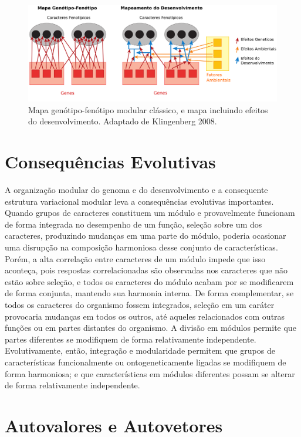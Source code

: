 \documentclass[portuges,]{tufte-handout}
\begin{document}
\begin{figure}
\includegraphics{./figuras/mapgenfen.png}
\caption{Mapa genótipo-fenótipo modular clássico, e mapa incluindo
efeitos do desenvolvimento. Adaptado de Klingenberg 2008.}
\label{mapagenfen}
\end{figure}

\section{Consequências Evolutivas}\label{consequuxeancias-evolutivas}

A organização modular do genoma e do desenvolvimento e a consequente
estrutura variacional modular leva a consequências evolutivas
importantes. Quando grupos de caracteres constituem um módulo e
provavelmente funcionam de forma integrada no desempenho de um função,
seleção sobre um dos caracteres, produzindo mudanças em uma parte do
módulo, poderia ocasionar uma disrupção na composição harmoniosa desse
conjunto de características. Porém, a alta correlação entre caracteres
de um módulo impede que isso aconteça, pois respostas correlacionadas
são observadas nos caracteres que não estão sobre seleção, e todos os
caracteres do módulo acabam por se modificarem de forma conjunta,
mantendo sua harmonia interna. De forma complementar, se todos os
caracteres do organismo fossem integrados, seleção em um caráter
provocaria mudanças em todos os outros, até aqueles relacionados com
outras funções ou em partes distantes do organismo. A divisão em módulos
permite que partes diferentes se modifiquem de forma relativamente
independente. Evolutivamente, então, integração e modularidade permitem
que grupos de características funcionalmente ou ontogeneticamente
ligadas se modifiquem de forma harmoniosa; e que características em
módulos diferentes possam se alterar de forma relativamente
independente.

\section{Autovalores e Autovetores}\label{autovalores-e-autovetores}
\end{document}
